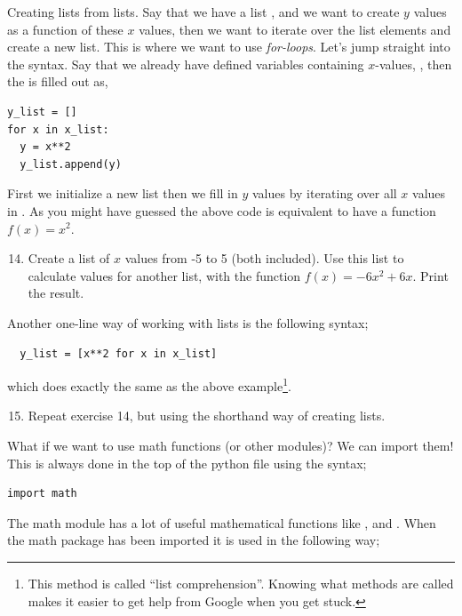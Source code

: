 \documentclass{article}
\begin{document}
Creating lists from lists. Say that we have a list ,
and we want to create $y$ values as a function of these $x$ values,
then we want to iterate over the list elements and create a new list.
This is where we want to use {\em for-loops}.
Let's jump straight into the syntax. Say that we already
have defined variables containing $x$-values, ,
then the  is filled out as,

\begin{lstlisting}
y_list = []
for x in x_list:
  y = x**2
  y_list.append(y)
\end{lstlisting}

First we initialize a new list
then we fill in $y$ values by iterating over
all $x$ values in .
As you might have guessed the above code is equivalent to have
a function $f(x) = x^2$.\\

\begin{enumerate}
  \setcounter{enumi}{13}
  \item Create a list of $x$ values from -5 to 5 (both included). Use this list
    to calculate values for another list, with the function $f(x) = -6x^2 + 6x$.
    Print the result.

\end{enumerate}

Another one-line way of working with lists is the following syntax;

\begin{lstlisting}
  y_list = [x**2 for x in x_list]
\end{lstlisting}

which does exactly the same as the above example\footnote{This method is
called ``list comprehension''. Knowing what methods are called makes
it easier to get help from Google when you get stuck. }.

\begin{enumerate}
  \setcounter{enumi}{14}
  \item Repeat exercise 14, but using the shorthand way of creating lists.
\end{enumerate}

What if we want to use math functions (or other modules)?
We can import them! This is always done in the top of the
python file using the syntax;

\begin{lstlisting}
import math
\end{lstlisting}

The math module has a lot of useful mathematical functions like ,
 and . When the math package has been imported it is used
in the following way;
\end{document}
